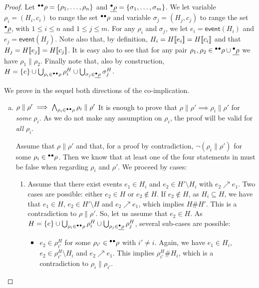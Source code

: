 \documentclass{article}
\newcommand{\event}[1]{\ensuremath{\mathsf{event}(#1)}}
\newcommand{\confl}{\ensuremath{\mathord{\#}}}
\begin{document}
\begin{proof}
Let ${}^\bullet{}^\bullet\rho = \{\rho_1, \ldots, \rho_n\}$ and $\underline{{}^\bullet\rho} =
\{\sigma_1, \ldots, \sigma_m\}$.  We let variable $\rho_i = (H_i, c_i)$ to
range the set ${}^\bullet{}^\bullet\rho$ and variable $\sigma_j = (H_j, c_j)$ to range
the set $\underline{{}^\bullet\rho}$, with $1 \le i \le n$ and $1 \le j \le m$.  For any
$\rho_i$ and $\sigma_j$, we let $e_i = \event{H_i}$ and $e_j = \event{H_j}$.
Note also that, by definition, $H_i = H[\![ e_i]\!] = H[\![ c_i]\!]$ and that $H_j =
H[\![ e_j]\!] = H[\![ c_j]\!]$.  It is easy also to see that for any pair $\rho_1,
\rho_2 \in {}^\bullet{}^\bullet\rho \cup \underline{{}^\bullet\rho}$ we have $\rho_1 \parallel
\rho_2$.  Finally note that, also by construction, $H = \{e\} \cup
\bigcup_{\rho_i \in {}^\bullet{}^\bullet\rho} \rho^H_i \cup \bigcup_{\sigma_j \in
\underline{{}^\bullet\rho}} \sigma^H_j$.

We prove in the sequel both directions of the co-implication. 

\begin{enumerate}[(a)]
\item $\rho \parallel \rho' \implies \bigwedge_{\rho_i \in {}^\bullet{}^\bullet\rho} \rho_i \parallel \rho'$  It is enough to prove that $\rho \parallel
\rho' \implies \rho_i \parallel \rho'$ for \emph{some} $\rho_i$.  As we do not
make any assumption on $\rho_i$, the proof will be valid for \emph{all}
$\rho_i$.

Assume that $\rho \parallel \rho'$ and that, for a proof by contradiction,
$\lnot (\rho_i \parallel \rho')$ for some $\rho_i \in {}^\bullet{}^\bullet\rho$.  Then we
know that at least one of the four statements in  must be
false when regarding $\rho_i$ and $\rho'$.  We proceed by cases:

\begin{enumerate}[1.]
\item Assume that there exist events $e_1 \in H_i$ and $e_2 \in H' \setminus
H_i$ with $e_2 \nearrow e_1$.  Two cases are possible: either $e_2 \in H$ or
$e_2 \notin H$.  If $e_2 \notin H$, as $H_i \subseteq H$, we have that $e_1 \in
H$, $e_2 \in H' \setminus H$ and $e_2 \nearrow e_1$, which implies $H \confl
H'$.  This is a contradiction to $\rho \parallel \rho'$.  So, let us assume
that $e_2 \in H$.  As $H = \{e\} \cup \bigcup_{\rho_i \in {}^\bullet{}^\bullet\rho}
\rho^H_i \cup \bigcup_{\rho_j \in \underline{{}^\bullet\rho}} \rho^H_j$, several
sub-cases are possible:

\begin{itemize}
\item $e_2 \in \rho^H_{i'}$ for some $\rho_{i'} \in {}^\bullet{}^\bullet\rho$ with $i'
\not= i$.  Again, we have $e_1 \in H_i$, $e_2 \in \rho^H_{i'} \setminus H_i$
and $e_2 \nearrow e_1$.  This implies $\rho^H_{i'} \confl H_i$, which is a
contradiction to $\rho_i \parallel \rho_{i'}$.


\end{itemize}
\end{enumerate}
\end{enumerate}
\end{proof}
\end{document}
